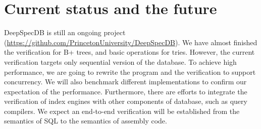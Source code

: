 \documentclass[sigplan,review,anonymous]{acmart}\settopmatter{printfolios=true,printccs=false,printacmref=false}
\begin{document}
\section{Current status and the future}

DeepSpecDB is still an ongoing project
(\url{https://github.com/PrincetonUniversity/DeepSpecDB}). We have almost
finished the verification for B+ trees, and basic operations for tries. However,
the current verification targets only sequential version of the database. To
achieve high performance, we are going to rewrite the program and the
verification to support concurrency. We will also benchmark different
implementations to confirm our expectation of the performance. Furthermore,
there are efforts to integrate the verification of index engines with other
components of database, such as query compilers. We expect an end-to-end
verification will be established from the semantics of SQL to the semantics of
assembly code.


\end{document}

